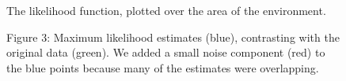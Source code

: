 \begin{figure}
\caption{The likelihood function, plotted over the area of the environment.}
\end{figure}

\begin{figure}
\caption{Figure 3: Maximum likelihood estimates (blue), contrasting with the
original data (green). We added a small noise component (red) to the
blue points because many of the estimates were overlapping.}
\end{figure}


